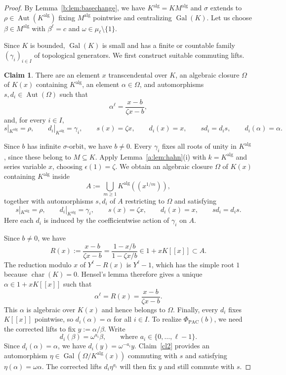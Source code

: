 \documentclass[10pt,a4paper]{amsart}
\renewcommand{\ge}{\geqslant}
\theoremstyle{definition}
\newtheorem{claim}{Claim}
\newenvironment{claimproof}[1][Proof of Claim \theclaim.]
 {%
	\proof[#1]%
\renewcommand*\qedsymbol{$\square$\tiny{Claim \theclaim}}
}
{%
	\endproof%
}
\newcommand{\alg}{\mathrm{alg}}
\DeclareMathOperator{\Gal}{Gal}
\DeclareMathOperator{\Aut}{Aut}
\DeclareMathOperator{\charac}{char}
\begin{document}
\begin{proof}
By Lemma~\ref{b:lem:basechange}, we have
$K^{\alg}=KM^{\alg}$ and $\sigma$ extends to
$\rho\in\Aut(K^{\alg})$ fixing $M^{\alg}$ pointwise and centralizing
$\Gal(K)$. Let us choose $\beta\in M^{\alg}$ with $\beta^\ell=c$ and $\omega\in \mu_\ell\setminus \{1\}$.

Since $K$ is bounded, $\Gal(K)$ is small and has a finite or
countable family $(\gamma_i)_{i\in I}$ of topological generators.
We first construct suitable commuting lifts.

\begin{claim}\label{cl1}
There are an element $x$ transcendental over $K$, an algebraic
closure $\Omega$ of $K(x)$ containing $K^{\alg}$, an element
$\alpha\in\Omega$, and automorphisms $s,d_i\in\Aut(\Omega)$ such that
\[
\alpha^\ell=\frac{x-b}{\zeta x-b},
\]
and, for every $i\in I$,
\[
s|_{K^{\alg}}=\rho,\qquad
d_i|_{K^{\alg}}=\gamma_i,\qquad
s(x)=\zeta x,\qquad d_i(x)=x,\qquad
sd_i=d_is,\qquad d_i(\alpha)=\alpha.
\]
\end{claim}

\begin{claimproof}
Since $b$ has infinite $\sigma$-orbit, we have $b\ne0$.
Every $\gamma_i$ fixes all roots of unity in $K^{\alg}$,
since these belong to $M\subseteq K$.
Apply Lemma~\ref{a:lem:hahn}\textup{(i)} with
$k=K^{\alg}$ and series variable $x$, choosing
$\epsilon(1)=\zeta$.
We obtain an algebraic closure $\Omega$ of $K(x)$
containing $K^{\alg}$ inside
\[
A:=\bigcup_{m\ge1}K^{\alg}((x^{1/m})),
\]
together with automorphisms $s,d_i$ of $A$ restricting to $\Omega$ and satisfying
\[
s|_{K^{\alg}}=\rho,\qquad
d_i|_{K^{\alg}}=\gamma_i,\qquad
s(x)=\zeta x,\qquad d_i(x)=x,\qquad sd_i=d_is.
\]
Here each $d_i$ is induced by the coefficientwise action
of $\gamma_i$ on $A$.

Since $b\ne0$, we have
\[
R(x):=\frac{x-b}{\zeta x-b}
     =\frac{1-x/b}{1-\zeta x/b}
     \in1+xK[[x]]\subset A.
\]
The reduction modulo $x$ of $Y^\ell-R(x)$ is
$Y^\ell-1$, which has the simple root $1$ because
$\charac(K)=0$.
Hensel's lemma therefore gives a unique
$\alpha\in1+xK[[x]]$ such that
\[
\alpha^\ell=R(x)=\frac{x-b}{\zeta x-b}.
\]
This $\alpha$ is algebraic over $K(x)$ and hence belongs
to $\Omega$. Finally, every $d_i$ fixes $K[[x]]$
pointwise, so $d_i(\alpha)=\alpha$ for all $i\in I$.
\end{claimproof}
To realize $\Phi_{\mathrm{PAC}}(b)$, we need the corrected
lifts to fix $y:=\alpha/\beta$. Write
\[
d_i(\beta)=\omega^{a_i}\beta,
\qquad \text{where }a_i\in\{0,\ldots,\ell-1\}.
\]
Since $d_i(\alpha)=\alpha$, we have
$d_i(y)=\omega^{-a_i}y$.
Claim~\ref{cl2} provides an automorphism
$\eta\in\Gal(\Omega/K^{\alg}(x))$ commuting with $s$
and satisfying $\eta(\alpha)=\omega\alpha$.
The corrected lifts $d_i\eta^{a_i}$ will then fix $y$
and still commute with $s$.


\end{proof}
\end{document}
